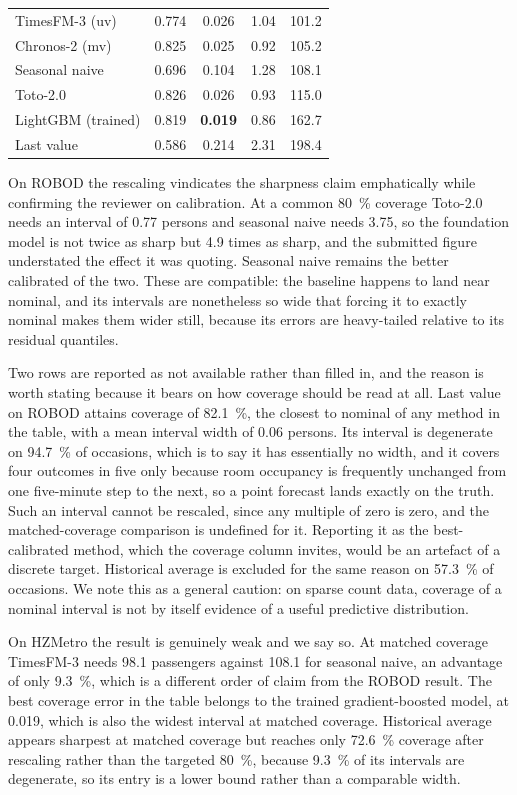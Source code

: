 \documentclass[11pt]{article}
\theoremstyle{plain}
\theoremstyle{definition}
\theoremstyle{remark}
\newcommand{\best}[1]{\textbf{#1}}
\newif\ifrevisionmarkup
\newcommand{\new}[1]{\ifrevisionmarkup\textcolor{revision}{#1}\else#1\fi}
\begin{document}
{\begin{table}[htbp]
\begin{tabular}{lcccc}
TimesFM-3 (uv)      & 0.774 & 0.026 & 1.04 & 101.2 \\
Chronos-2 (mv)      & 0.825 & 0.025 & 0.92 & 105.2 \\
Seasonal naive      & 0.696 & 0.104 & 1.28 & 108.1 \\
Toto-2.0            & 0.826 & 0.026 & 0.93 & 115.0 \\
LightGBM (trained)  & 0.819 & \best{0.019} & 0.86 & 162.7 \\
Last value          & 0.586 & 0.214 & 2.31 & 198.4 \\
\bottomrule
\end{tabular}
\end{table}}

\new{On ROBOD the rescaling vindicates the sharpness claim emphatically while confirming the reviewer on calibration. At a common \SI{80}{\percent} coverage Toto-2.0 needs an interval of \num{0.77} persons and seasonal naive needs \num{3.75}, so the foundation model is not twice as sharp but \num{4.9} times as sharp, and the submitted figure understated the effect it was quoting. Seasonal naive remains the better calibrated of the two. These are compatible: the baseline happens to land near nominal, and its intervals are nonetheless so wide that forcing it to exactly nominal makes them wider still, because its errors are heavy-tailed relative to its residual quantiles.}

\new{Two rows are reported as not available rather than filled in, and the reason is worth stating because it bears on how coverage should be read at all. Last value on ROBOD attains coverage of \SI{82.1}{\percent}, the closest to nominal of any method in the table, with a mean interval width of \num{0.06} persons. Its interval is degenerate on \SI{94.7}{\percent} of occasions, which is to say it has essentially no width, and it covers four outcomes in five only because room occupancy is frequently unchanged from one five-minute step to the next, so a point forecast lands exactly on the truth. Such an interval cannot be rescaled, since any multiple of zero is zero, and the matched-coverage comparison is undefined for it. Reporting it as the best-calibrated method, which the coverage column invites, would be an artefact of a discrete target. Historical average is excluded for the same reason on \SI{57.3}{\percent} of occasions. We note this as a general caution: on sparse count data, coverage of a nominal interval is not by itself evidence of a useful predictive distribution.}

\new{On HZMetro the result is genuinely weak and we say so. At matched coverage TimesFM-3 needs \num{98.1} passengers against \num{108.1} for seasonal naive, an advantage of only \SI{9.3}{\percent}, which is a different order of claim from the ROBOD result. The best coverage error in the table belongs to the trained gradient-boosted model, at \num{0.019}, which is also the widest interval at matched coverage. Historical average appears sharpest at matched coverage but reaches only \SI{72.6}{\percent} coverage after rescaling rather than the targeted \SI{80}{\percent}, because \SI{9.3}{\percent} of its intervals are degenerate, so its entry is a lower bound rather than a comparable width.}
\end{document}
